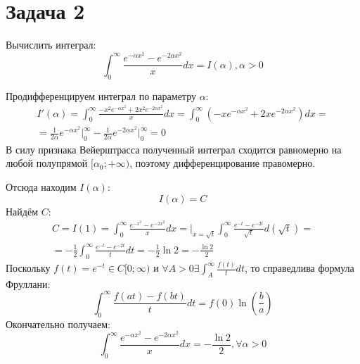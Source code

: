 \documentclass[11pt]{article}
\author{Sergey Makarov}
\date{\today}
\title{}
\begin{document}
\section{Задача 2}
\label{sec:orgb9a7774}
Вычислить интеграл:
$$\int_0^\infty\frac{e^{-\alpha x^2} - e^{-2\alpha x^2}}xdx = I(\alpha), \alpha > 0$$

Продифференцируем интеграл по параметру \(\alpha\):
\begin{multline*}
I'(\alpha) = \int_0^\infty\frac{-x^2e^{-\alpha x^2} + 2x^2e^{-2\alpha x^2}}xdx =
\int_0^\infty(-xe^{-\alpha x^2} + 2xe^{-2\alpha x^2})dx = \\
= \frac1{2\alpha}e^{-\alpha x^2}\bigg|_0^\infty - \frac1{2\alpha}{e^{-2\alpha x^2}\bigg|_0^\infty} = 0
\end{multline*}
В силу признака Вейерштрасса полученный интеграл сходится равномерно на любой полупрямой
\([\alpha_0; +\infty)\), поэтому дифференцирование правомерно.

Отсюда находим \(I(\alpha)\):
$$I(\alpha) = C$$
Найдём \(C\):
\begin{multline*}
C = I(1) = \int_0^\infty\frac{e^{-x^2} - e^{-2x^2}}xdx =\bigg|_{x = \sqrt t}\int_0^\infty\frac{e^{-t} - e^{-2t}}{\sqrt t}d(\sqrt t) = \\
= -\frac12\int_0^\infty\frac{e^{-t} - e^{-2t}}tdt = -\frac12\ln2 = -\frac{\ln2}2
\end{multline*}
Поскольку \(f(t) = e^{-t} \in C[0; \infty)\) и \(\forall A > 0 \exists \int_A^\infty\frac{f(t)}tdt\), то справедлива формула Фруллани:
$$\int_0^\infty\frac{f(at) - f(bt)}tdt = f(0)\ln\left(\frac ba\right)$$
Окончательно получаем:
$$\int_0^\infty\frac{e^{-\alpha x^2} - e^{-2\alpha x^2}}xdx = -\frac{\ln2}2, \forall \alpha > 0$$
\end{document}
